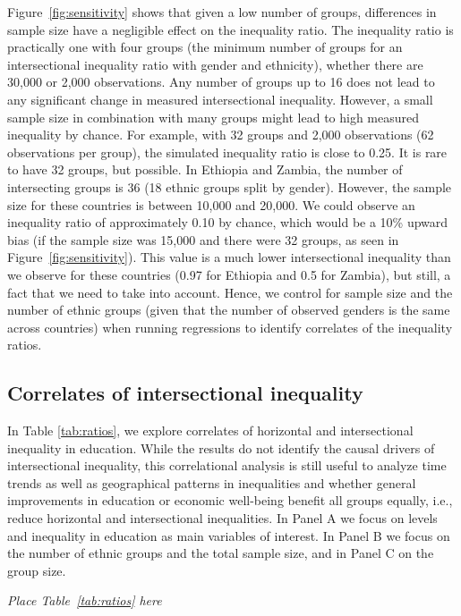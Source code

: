 Figure~\ref{fig:sensitivity} shows that given a low number of groups, differences in sample size have a negligible effect on the inequality ratio. The inequality ratio is practically one with four groups (the minimum number of groups for an intersectional inequality ratio with gender and ethnicity), whether there are 30,000 or 2,000 observations. Any number of groups up to 16 does not lead to any significant change in measured intersectional inequality. However, a small sample size in combination with many groups might lead to high measured inequality by chance. For example, with 32 groups and 2,000 observations (62 observations per group), the simulated inequality ratio is close to 0.25. It is rare to have 32 groups, but possible. In Ethiopia and Zambia, the number of intersecting groups is 36 (18 ethnic groups split by gender). However, the sample size for these countries is between 10,000 and 20,000. We could observe an inequality ratio of approximately 0.10 by chance, which would be a 10\% upward bias (if the sample size was 15,000 and there were 32 groups, as seen in Figure~\ref{fig:sensitivity}). This value is a much lower intersectional inequality than we observe for these countries (0.97 for Ethiopia and 0.5 for Zambia), but still, a fact that we need to take into account. Hence, we control for sample size and the number of ethnic groups (given that the number of observed genders is the same across countries) when running regressions to identify correlates of the inequality ratios.

\hypertarget{correlates-of-intersectional-inequality}{%
\subsection{Correlates of intersectional inequality}\label{correlates-of-intersectional-inequality}}

In Table \ref{tab:ratios}, we explore correlates of horizontal and intersectional inequality in education. While the results do not identify the causal drivers of intersectional inequality, this correlational analysis is still useful to analyze time trends as well as geographical patterns in inequalities and whether general improvements in education or economic well-being benefit all groups equally, i.e., reduce horizontal and intersectional inequalities. In Panel A we focus on levels and inequality in education as main variables of interest. In Panel B we focus on the number of ethnic groups and the total sample size, and in Panel C on the group size. 
\begin{center}
    \textit{Place Table~\ref{tab:ratios} here}
\end{center}

